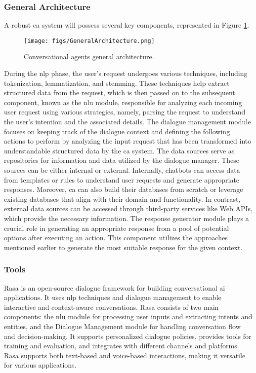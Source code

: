 \documentclass[a4paper,fleqn]{cas-dc}
\begin{document}
\subsubsection{General Architecture}

A robust \gls{ca} system will possess several key components, represented in Figure \ref{fig:generalArchitecture}.

\begin{figure}[htbp]
	\centering
	\texttt{[image: figs/GeneralArchitecture.png]}
	\caption{Conversational agents general architecture.}
	\label{fig:generalArchitecture}
\end{figure}

During the \gls{nlp} phase, the user's request undergoes various techniques, including tokenization, lemmatization, and stemming. These techniques help extract structured data from the request, which is then passed on to the subsequent component, known as the \gls{nlu} module, responsible for analyzing each incoming user request using various strategies, namely, parsing the request to understand the user's intention and the associated details. The dialogue management module focuses on keeping track of the dialogue context and defining the following actions to perform by analyzing the input request that has been
transformed into understandable structured data by the \gls{ca} system. The data sources serve as repositories for information and data utilized by the dialogue manager. These sources can be either internal or external. Internally, chatbots can access data from templates or rules to understand user requests and generate appropriate responses. Moreover, \gls{ca} can also build their databases from scratch or leverage existing databases that align with their domain and functionality. In contrast, external data sources can be accessed through third-party services like Web APIs, which provide the necessary information. The response generator module plays a crucial role in generating an appropriate response from a pool of potential options after executing an action. This component utilizes the approaches mentioned earlier to generate the most suitable response for the given context.

\subsubsection{Tools}

Rasa \cite{rasa} is an open-source dialogue framework for building conversational \gls{ai} applications. It uses \gls{nlp} techniques and dialogue management to enable interactive and context-aware conversations. Rasa consists of two main components: the \gls{nlu} module for processing user inputs and extracting intents and entities, and the Dialogue Management module for handling conversation flow and decision-making. It supports personalized dialogue policies, provides tools for training and evaluation, and integrates with different channels and platforms. Rasa supports both text-based and voice-based interactions, making it versatile for various applications.
\end{document}
